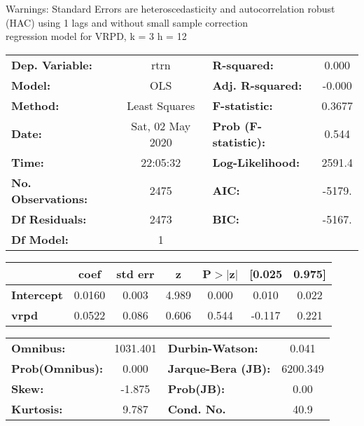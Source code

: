 Warnings: \newline
 [1] Standard Errors are heteroscedasticity and autocorrelation robust (HAC) using 1 lags and without small sample correction\\ 

regression model for VRPD, k = 3 h = 12\begin{center}
\begin{tabular}{lclc}
\toprule
\textbf{Dep. Variable:}    &       rtrn       & \textbf{  R-squared:         } &     0.000   \\
\textbf{Model:}            &       OLS        & \textbf{  Adj. R-squared:    } &    -0.000   \\
\textbf{Method:}           &  Least Squares   & \textbf{  F-statistic:       } &    0.3677   \\
\textbf{Date:}             & Sat, 02 May 2020 & \textbf{  Prob (F-statistic):} &    0.544    \\
\textbf{Time:}             &     22:05:32     & \textbf{  Log-Likelihood:    } &    2591.4   \\
\textbf{No. Observations:} &        2475      & \textbf{  AIC:               } &    -5179.   \\
\textbf{Df Residuals:}     &        2473      & \textbf{  BIC:               } &    -5167.   \\
\textbf{Df Model:}         &           1      & \textbf{                     } &             \\
\bottomrule
\end{tabular}
\begin{tabular}{lcccccc}
                   & \textbf{coef} & \textbf{std err} & \textbf{z} & \textbf{P$> |$z$|$} & \textbf{[0.025} & \textbf{0.975]}  \\
\midrule
\textbf{Intercept} &       0.0160  &        0.003     &     4.989  &         0.000        &        0.010    &        0.022     \\
\textbf{vrpd}      &       0.0522  &        0.086     &     0.606  &         0.544        &       -0.117    &        0.221     \\
\bottomrule
\end{tabular}
\begin{tabular}{lclc}
\textbf{Omnibus:}       & 1031.401 & \textbf{  Durbin-Watson:     } &    0.041  \\
\textbf{Prob(Omnibus):} &   0.000  & \textbf{  Jarque-Bera (JB):  } & 6200.349  \\
\textbf{Skew:}          &  -1.875  & \textbf{  Prob(JB):          } &     0.00  \\
\textbf{Kurtosis:}      &   9.787  & \textbf{  Cond. No.          } &     40.9  \\
\bottomrule
\end{tabular}
\end{center}

